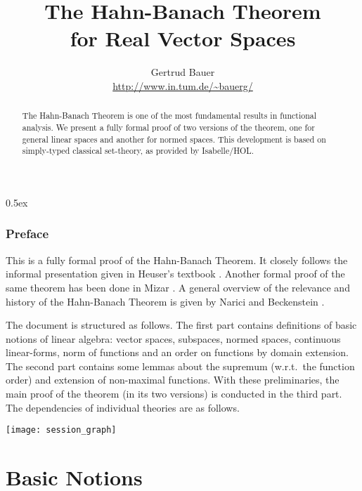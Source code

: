\documentclass[10pt,a4paper,twoside]{article}
\begin{document}
\pagestyle{headings}

\title{The Hahn-Banach Theorem \\ for Real Vector Spaces}
\author{Gertrud Bauer \\ \url{http://www.in.tum.de/~bauerg/}}
\maketitle

\begin{abstract}
  The Hahn-Banach Theorem is one of the most fundamental results in functional
  analysis. We present a fully formal proof of two versions of the theorem,
  one for general linear spaces and another for normed spaces.  This
  development is based on simply-typed classical set-theory, as provided by
  Isabelle/HOL.
\end{abstract}


\tableofcontents
\parindent 0pt \parskip 0.5ex

\clearpage
\section{Preface}

This is a fully formal proof of the Hahn-Banach Theorem. It closely follows
the informal presentation given in Heuser's textbook \cite[{\S} 36]{Heuser:1986}.
Another formal proof of the same theorem has been done in Mizar
\cite{Nowak:1993}.  A general overview of the relevance and history of the
Hahn-Banach Theorem is given by Narici and Beckenstein \cite{Narici:1996}.

\medskip The document is structured as follows.  The first part contains
definitions of basic notions of linear algebra: vector spaces, subspaces,
normed spaces, continuous linear-forms, norm of functions and an order on
functions by domain extension.  The second part contains some lemmas about the
supremum (w.r.t.\ the function order) and extension of non-maximal functions.
With these preliminaries, the main proof of the theorem (in its two versions)
is conducted in the third part.  The dependencies of individual theories are
as follows.

\begin{center}
  \texttt{[image: session\_graph]}  
\end{center}

\clearpage
\part {Basic Notions}
\end{document}
